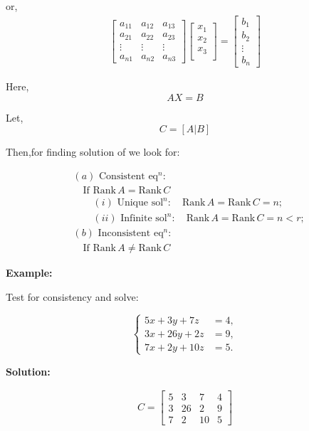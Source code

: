 \documentclass{article}
\begin{document}
or, 
\begin{align*}
    \begin{bmatrix}
        a_{11} & a_{12} & a_{13} \\
        a_{21} & a_{22} & a_{23} \\
        \vdots & \vdots & \vdots \\
        a_{n1} & a_{n2} & a_{n3}
    \end{bmatrix}
    \begin{bmatrix}
        x_1 \\
        x_2 \\
        x_3 \\
    \end{bmatrix}
    = \begin{bmatrix}
        b_1 \\
        b_2 \\
        \vdots \\
        b_n
    \end{bmatrix}
\end{align*}

Here, \[AX = B\]

Let, \[C = [A|B]\]

Then,for finding solution of we look for:

\begin{align*}
    &(a) \text{ Consistent } \text{eq}^n: \\
    &\quad \text{If } \text{Rank} \, A = \text{Rank} \, C \\
    &\quad \quad (i) \text{ Unique } \text{sol}^n: \quad \text{Rank} \, A = \text{Rank} \, C = n ; \\
    &\quad \quad (ii) \text{ Infinite } \text{sol}^n: \quad \text{Rank} \, A = \text{Rank} \, C = n < r ; \\
    &(b) \text{ Inconsistent } \text{eq}^n: \\
    &\quad \text{If } \text{Rank} \, A \neq \text{Rank} \, C         
\end{align*}


\textbf{Example:}

Test for consistency and solve:

\[
\begin{cases}
5x+3y+7z &= 4, \\
3x+26y+2z &= 9, \\
7x+2y+10z &= 5.
\end{cases}
\]

\textbf{Solution:}

\begin{align*}
    C=\left[\begin{array}{ccc|c}
    5 & 3 & 7 & 4 \\
    3 & 26 & 2 & 9 \\
    7 & 2 & 10 & 5
    \end{array}\right]
\end{align*}
    
\end{document}
